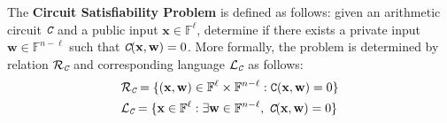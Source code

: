 \documentclass[../lecture-notes-148x210.tex]{subfiles}
\begin{document}
\begin{definition}
    The \textbf{Circuit Satisfiability Problem} is defined as follows: given an
    arithmetic circuit $\textit{\texttt{C}}$ and a public input $\mathbf{x} \in
    \mathbb{F}^{\ell}$, determine if there exists a private input $\mathbf{w}
    \in \mathbb{F}^{n-\ell}$ such that $\textit{\texttt{C}}(\mathbf{x},\mathbf{w}) = 0$. More
    formally, the problem is determined by relation $\mathcal{R}_{\textit{\texttt{C}}}$ and
    corresponding language $\mathcal{L}_{\textit{\texttt{C}}}$ as follows:
    \begin{equation*}
        \begin{aligned}
            &\mathcal{R}_{\textit{\texttt{C}}} = \{(\mathbf{x},\mathbf{w}) \in \mathbb{F}^{\ell} \times \mathbb{F}^{n-\ell}: \mathtt{C}(\mathbf{x},\mathbf{w}) = 0\} \\
            &\mathcal{L}_{\textit{\texttt{C}}} = \{\mathbf{x} \in \mathbb{F}^{\ell}: \exists \mathbf{w} \in \mathbb{F}^{n-\ell},\; \textit{\texttt{C}}(\mathbf{x},\mathbf{w}) = 0\}            
        \end{aligned}
    \end{equation*}
\end{definition}
\end{document}
